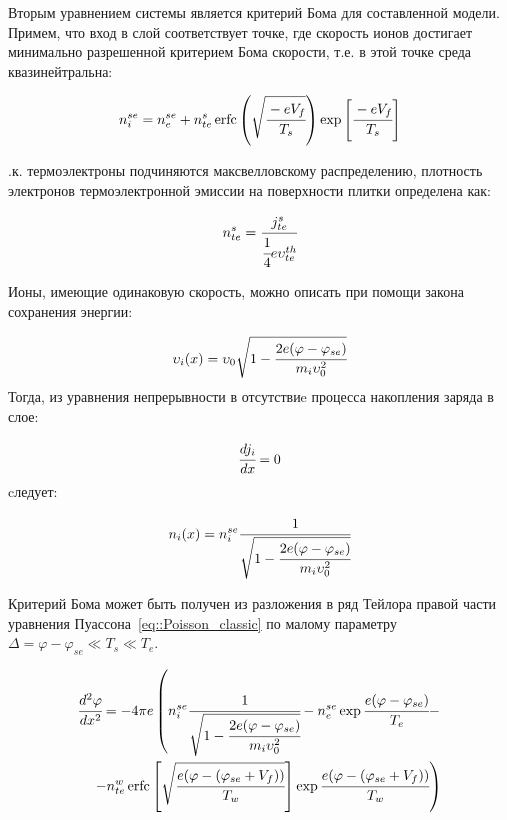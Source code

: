 Вторым уравнением системы является критерий Бома для составленной модели. 
Примем, что вход в слой соответствует точке, где скорость ионов достигает
минимально разрешенной критерием Бома скорости, т.е. в этой точке среда квазинейтральна:

\begin{equation}
	n_i^{se} = n_e^{se} + n_{te}^s\operatorname{erfc}\left(\sqrt{\cfrac{-eV_f}{T_s}}\right)\exp{\left[\cfrac{-eV_f}{T_s}\right]}
	\label{eq::quasineutrality_classic}
\end{equation}

.к. термоэлектроны подчиняются максвелловскому распределению, 
плотность электронов термоэлектронной эмиссии на поверхности плитки определена как:

\begin{equation}
    n_{te}^s = \cfrac{j_{te}^s}{\cfrac{1}{4}e\upsilon_{te}^{th}}
	\label{eq::nte_s_classic}
\end{equation}

Ионы, имеющие одинаковую скорость, можно описать при помощи закона сохранения энергии:

\begin{equation}
	\upsilon_i(x) = \upsilon_0\sqrt{1 - \cfrac{2e(\varphi-\varphi_{se})}{m_i\upsilon_0^2}}
\end{equation}
Тогда, из уравнения непрерывности в отсутствиe процесса накопления заряда в слое:

\begin{equation}
	\cfrac{dj_i}{dx} = 0
\end{equation}
cледует:

\begin{equation}
	n_i(x) = n_i^{se}\cfrac{1}{\sqrt{1 - \cfrac{2e(\varphi-\varphi_{se})}{m_i\upsilon_0^2}}}
\end{equation}

Критерий Бома может быть получен из разложения в ряд Тейлора правой части уравнения Пуассона~\eqref{eq::Poisson_classic} по 
малому параметру $\Delta = \varphi - \varphi_{se} \ll T_s \ll T_e$.

\begin{equation}
	\begin{split}
	\cfrac{d^2\varphi}{dx^2} = -4\pi e\left(n_i^{se}\cfrac{1}{\sqrt{1 - \cfrac{2e(\varphi-\varphi_{se})}{m_i\upsilon_0^2}}} - n_e^{se}\exp{\cfrac{e(\varphi - \varphi_{se})}{T_e}} -\right.
	\\ \left.- n_{te}^w\operatorname{erfc}\left[\sqrt{\cfrac{e(\varphi - (\varphi_{se} + V_f))}{T_w}}\right]\exp{\cfrac{e(\varphi - (\varphi_{se} + V_f))}{T_w}}\right)
	\end{split}
	\label{eq::Poisson_classic}
\end{equation}


